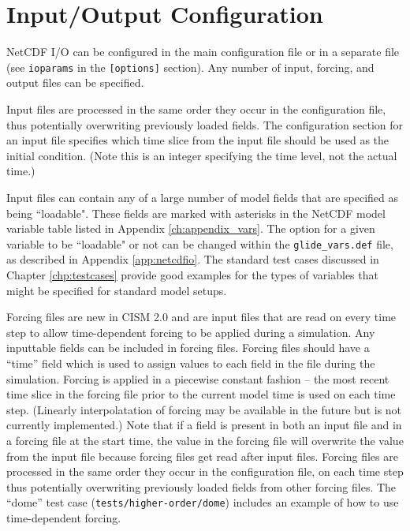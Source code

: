 \section{Input/Output Configuration}

NetCDF I/O can be configured in the main configuration file or in a separate file 
(see \texttt{ioparams} in the \texttt{[options]} section). 
Any number of input, forcing, and output files can be specified. 

Input files are processed in the same order they occur in the configuration file, 
thus potentially overwriting previously loaded fields.  The configuration section 
for an input file specifies which time slice from the input file should be used as
the initial condition.  (Note this is an integer specifying the time level, not
the actual time.)

Input files can contain any of a large number of model fields that are specified as being
``loadable". These fields are marked with asterisks in the NetCDF model variable
table listed in Appendix \ref{ch:appendix_vars}. The option for a given variable to be ``loadable" 
or not can be changed within the \texttt{glide\_vars.def} file, as described in Appendix \ref{app:netcdfio}. 
The standard test cases discussed in Chapter \ref{chp:testcases} provide good examples for the types 
of variables that might be specified for standard model setups.    

Forcing files are new in CISM 2.0 and are input files that are read on every 
time step to allow time-dependent
forcing to be applied during a simulation.  Any inputtable fields can be included
in forcing files.  Forcing files should have a ``time'' field which is used to 
assign values to each field in the file during the simulation.  Forcing is applied 
in a piecewise constant fashion -- the most recent time slice in the forcing file prior
to the current model time is used on each time step.  (Linearly interpolatation of
forcing may be available in the future but is not currently implemented.)
Note that if a field is present in both an input file and in a
forcing file at the start time, the value in the forcing file will overwrite the value
from the input file because forcing files get read after input files.
Forcing files are processed in the same order they occur in the configuration file, 
on each time step thus potentially overwriting previously loaded fields from other
forcing files.  The ``dome'' test case (\texttt{tests/higher-order/dome}) includes 
an example of how to use time-dependent forcing.

